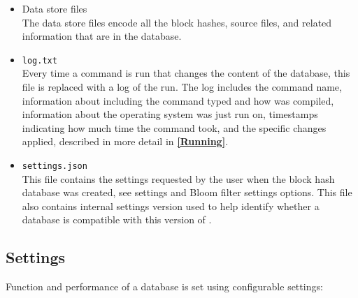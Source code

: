 \documentclass[11pt,fleqn]{article} %
\begin{document}
\begin{itemize}
\item Data store files \\
The data store files encode all the block hashes, source files, and related information that are in the database.


\item \texttt{log.txt} \\
Every time a command is run that changes the content of the database, this file is replaced with a log of the run.
The log includes the command name, information about \hdb including the command typed and how \hdb was compiled, information about the operating system \hdb was just run on, timestamps indicating how much time the command took, and the specific \hdb changes applied, described in more detail in \textbf{\autoref{Running}}.
\item \texttt{settings.json} \\
This file contains the settings requested by the user when the block hash database was created, see \hdb settings and Bloom filter settings options.
This file also contains internal \hdb settings version used to help \hdb identify whether a database is compatible with this version of \hdb.
\end{itemize}

\subsection{Settings}
\label{Settings}
Function and performance of a \hdb database is set using configurable settings:\\
\end{document}

